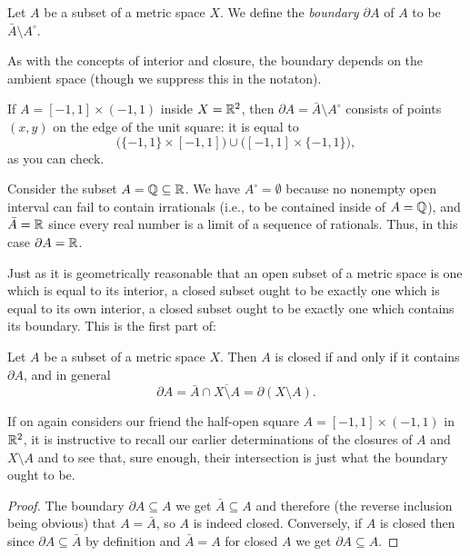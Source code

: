 \begin{definition}
  Let \(A\) be a subset of a metric space \(X\). We define the
  \emph{boundary \(\partial A\)} of \(A\) to be \(\bar A\setminus
  A^\circ\).
\end{definition}

As with the concepts of interior and closure, the boundary depends on the
ambient space (though we suppress this in the notaton).

\begin{example}
  If \(A=[-1,1]\times(-1,1)\) inside \(X=\mathbb{R}^2\), then \(\partial A=\bar
  A\setminus A^\circ\) consists of points \((x,y)\) on the edge of the unit
  square: it is equal to
  \[
    \bigl(\{-1,1\}\times[-1,1]\bigr)\cup
    \bigl([-1,1]\times\{-1,1\}\bigr),
  \]
  as you can check.
\end{example}

\begin{example}
  Consider the subset \(A=\mathbb{Q}\subseteq\mathbb{R}\). We have
  \(A^\circ=\emptyset\) because no nonempty open interval can fail to
  contain irrationals (i.e., to be contained inside of \(A=\mathbb{Q}\)), and
  \(\bar A=\mathbb{R}\) since every real number is a limit of a sequence of
  rationals. Thus, in this case \(\partial A=\mathbb{R}\).
\end{example}

Just as it is geometrically reasonable that an open subset of a metric
space is one which is equal to its interior, a closed subset ought to be
exactly one which is equal to its own interior, a closed subset ought to be
exactly one which contains its boundary. This is the first part of:

\begin{theorem}
  Let \(A\) be a subset of a metric space \(X\). Then \(A\) is closed if
  and only if it contains \(\partial A\), and in general
  \[
    \partial A=\bar A\cap\overline{X\setminus A}=\partial(X\setminus A).
  \]
\end{theorem}

If on again considers our friend the half-open square
\(A=[-1,1]\times(-1,1)\) in \(\mathbb{R}^2\), it is instructive to recall our
earlier determinations of the closures of \(A\) and \(X\setminus A\) and to
see that, sure enough, their intersection is just what the boundary ought
to be.

\begin{proof}
  The boundary \(\partial A\subseteq A\) we get \(\bar A\subseteq A\) and
  therefore (the reverse inclusion being obvious) that \(A=\bar A\), so
  \(A\) is indeed closed. Conversely, if \(A\) is closed then since
  \(\partial A\subseteq\bar A\) by definition and \(\bar A=A\) for closed
  \(A\) we get \(\partial A\subseteq A\).
\end{proof}

